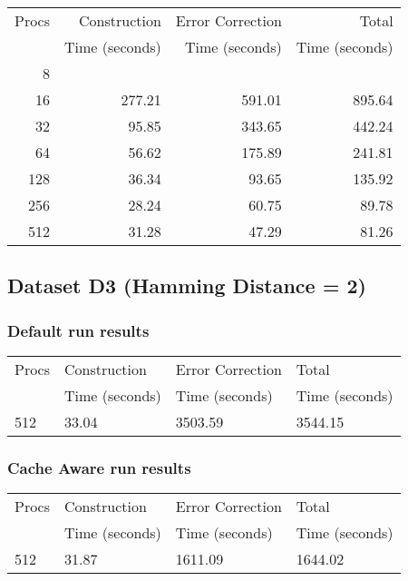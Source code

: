 \documentclass[integrals, nointegrals, article, 12pt, a4paper]{article}
\begin{document}
\begin{center}
\begin{tabular}{rrrr}
\hline
Procs & Construction & Error Correction & Total\\
 & Time (seconds) & Time (seconds) & Time (seconds)\\
\hline
8 &  &  & \\
16 & 277.21 & 591.01 & 895.64\\
32 & 95.85 & 343.65 & 442.24\\
64 & 56.62 & 175.89 & 241.81\\
128 & 36.34 & 93.65 & 135.92\\
256 & 28.24 & 60.75 & 89.78\\
512 & 31.28 & 47.29 & 81.26\\
\hline
\end{tabular}
\end{center}
\subsection{Dataset D3 (Hamming Distance = 2)}
\label{sec-2-4}
\subsubsection{Default run results}
\label{sec-2-4-1}

\begin{center}
\begin{tabular}{llll}
\hline
Procs & Construction & Error Correction & Total\\
 & Time (seconds) & Time (seconds) & Time (seconds)\\
\hline
512 & 33.04 & 3503.59 & 3544.15\\
\hline
\end{tabular}
\end{center}
\subsubsection{Cache Aware run results}
\label{sec-2-4-2}

\begin{center}
\begin{tabular}{llll}
\hline
Procs & Construction & Error Correction & Total\\
 & Time (seconds) & Time (seconds) & Time (seconds)\\
\hline
512 & 31.87 & 1611.09 & 1644.02\\
\hline
\end{tabular}
\end{center}
\end{document}
